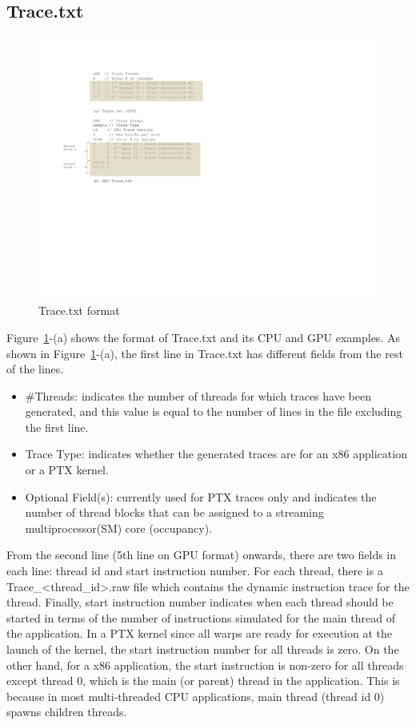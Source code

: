 \subsection{Trace.txt}


\begin{figure}[htb]
\centering
\includegraphics{figs/trace_format}
\caption{Trace.txt format} 
\label{fig:trace_format}
\end{figure}


Figure~\ref{fig:trace_format}-(a) shows the format of Trace.txt and its CPU and GPU
examples.  As shown in Figure~\ref{fig:trace_format}-(a), the first line in
Trace.txt has different fields from the rest of the lines.

\begin{itemize}\itemsep2pt
\item \#Threads: indicates the number of threads for which traces have
  been generated, and this value is equal to the number of lines in
  the file excluding the first line.
\item Trace Type: indicates whether the generated traces are for an
  x86 application or a PTX kernel.
\item Optional Field(s): currently used for PTX traces only and
  indicates the number of thread blocks that can be assigned to a
  streaming multiprocessor(SM) core (occupancy).
\end{itemize}

From the second line (5th line on GPU format)  onwards, there are two fields in each line:
thread id and start instruction number. For each thread, there is a
Trace\_<thread\_id>.raw file which contains the dynamic instruction
trace for the thread. Finally, start instruction number indicates when
each thread should be started in terms of the number of instructions
simulated for the main thread of the application. In a PTX kernel
since all warps are ready for execution at the launch of the kernel,
the start instruction number for all threads is zero. On the other
hand, for a x86 application, the start instruction is non-zero for all
threads except thread 0, which is the main (or parent) thread in the
application. This is because in most multi-threaded CPU applications,
main thread (thread id 0) spawns children threads.


